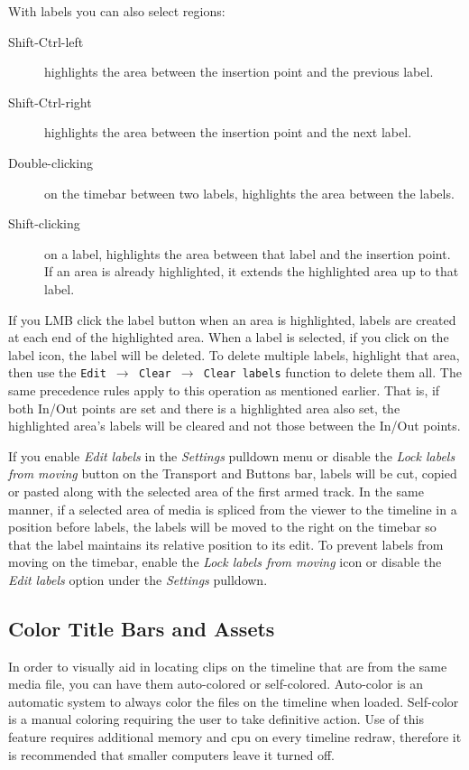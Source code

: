 With labels you can also select regions:

\begin{description}
    \item[Shift-Ctrl-left] highlights the area between the insertion point and the previous label.
    \item[Shift-Ctrl-right] highlights the area between the insertion point and the next label.
    \item[Double-clicking] on the timebar between two labels, highlights the area between the labels.	   
    \item[Shift-clicking] on a label, highlights the area between that label and the insertion point.
        If an area is already highlighted, it extends the highlighted area up to that label.
\end{description}

If you LMB click the label button when an area is highlighted, labels are created at each end of the
highlighted area. 
When a label is selected, if you click on the label icon, the label will be deleted. 
To delete multiple labels, highlight that area, then use the \texttt{Edit $\rightarrow$ Clear $\rightarrow$ Clear labels}
function to delete them all. The same precedence rules apply to this operation as mentioned earlier.  That
is, if both In/Out points are set and there is a highlighted area also set, the highlighted area's 
labels will be cleared and not those between the In/Out points.

If you enable \emph{Edit labels} in the \textit{Settings} pulldown menu or disable the \emph{Lock labels from moving}
button on the Transport and Buttons bar, labels will be cut, copied or pasted along with the selected
area of the first armed track. 
In the same manner, if a selected area of media is spliced from the viewer to the timeline in a position 
before labels, the labels will be moved to the right on the timebar so that the label maintains its 
relative position to its edit. 
To prevent labels from moving on the timebar, enable the \emph{Lock labels from moving} icon or
disable the \emph{Edit labels} option under the \textit{Settings} pulldown.

\subsection{Color Title Bars and Assets}%
\label{sub:color_title_bars_and_assets}
In order to visually aid in locating clips on the timeline that are from the same media file, you can have them auto-colored or self-colored.  Auto-color is
an automatic system to always color the files on the timeline when loaded. 
Self-color is a manual coloring requiring the user to take definitive action.
Use of this feature requires additional memory and cpu on every timeline redraw, therefore it is recommended that smaller computers leave it turned off.

